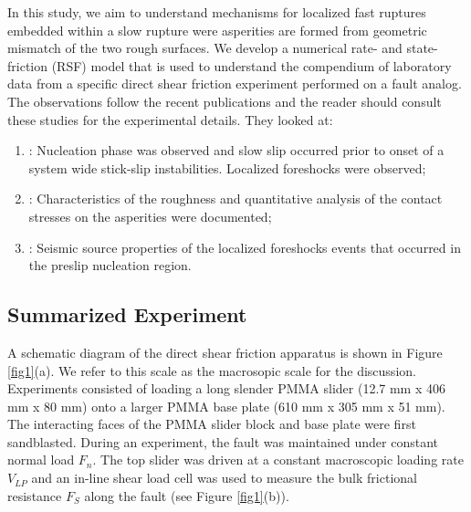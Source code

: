 \documentclass[preprint,1p, 10pt,authoryear]{elsarticle}
\begin{document}
In this study, we aim to understand mechanisms for localized fast ruptures embedded within a slow rupture were asperities are formed from geometric mismatch of the two rough surfaces. We develop a numerical rate- and state-friction (RSF) model \citep{Ampuero2008, Rubin2005,Luo2017} that is used to understand the compendium of laboratory data from a specific direct shear friction experiment performed on a fault analog. The observations follow the recent publications and the reader should consult these studies for the experimental details. They looked at:

\begin{enumerate}
\item \citet{Selvadurai2015}: Nucleation phase was observed and slow slip occurred prior to onset of a system wide stick-slip instabilities. Localized foreshocks were observed;
\item \citet{Selvadurai2017}: Characteristics of the roughness and quantitative analysis of the contact stresses on the asperities were documented;
\item \citet{Selvadurai2019}: Seismic source properties of the localized foreshocks events that occurred in the preslip nucleation region.
\end{enumerate}

\subsection{Summarized Experiment}
\label{GeneralExp}
A schematic diagram of the direct shear friction apparatus is shown in Figure \ref{fig1}(a). We refer to this scale as the macrosopic scale for the discussion. Experiments consisted of loading a long slender PMMA slider (12.7 mm x 406 mm x 80 mm) onto a larger PMMA base plate (610 mm x 305 mm x 51 mm). The interacting faces of the PMMA slider block and base plate were first sandblasted. During an experiment, the fault was maintained under constant normal load $F_{n}$.  The top slider was driven at a constant macroscopic loading rate $V_{LP}$ and an in-line shear load cell was used to measure the bulk frictional resistance $F_{S}$ along the fault (see Figure \ref{fig1}(b)).   
  
\end{document}
